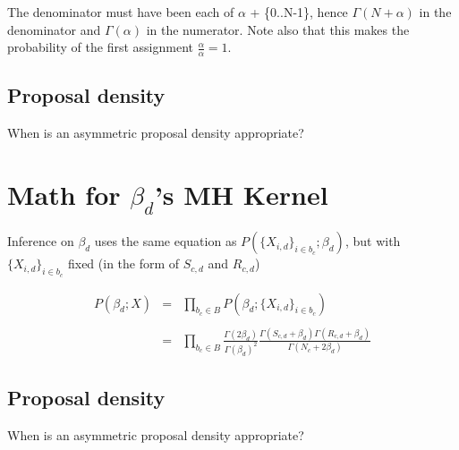 \documentclass{article}
\begin{document}
The denominator must have been each of $\alpha$ + \{0..N-1\}, hence $\Gamma(N+\alpha)$ in the denominator and $\Gamma(\alpha)$ in the numerator.  Note also that this makes the probability of the first assignment $\frac{\alpha}{\alpha}=1$.

\subsection{Proposal density}

When is an asymmetric proposal density appropriate?

\section{Math for $\beta_d$'s MH Kernel}

Inference on $\beta_d$ uses the same equation as $P(\{X_{i,d}\}_{i \in b_c};\beta_d)$, but with $\{X_{i,d}\}_{i \in b_c}$ fixed (in the form of $S_{c,d}$ and $R_{c,d}$)

\begin{equation}
\begin{matrix}
P(\beta_d;X) & = & \prod_{b_c \in B} P(\beta_d;\{X_{i,d}\}_{i \in b_c}) \\
\\
 & = & \prod_{b_c \in B} \frac{\Gamma(2\beta_d)}{\Gamma(\beta_d)^2} \frac{\Gamma(S_{c,d} + \beta_d)\Gamma(R_{c,d} + \beta_d)}{\Gamma(N_c + 2 \beta_d)}
\end{matrix}
\end{equation}

\subsection{Proposal density}

When is an asymmetric proposal density appropriate?
\end{document}
